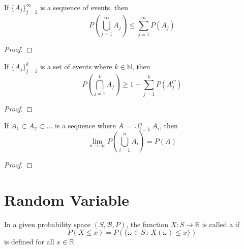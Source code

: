 \documentclass[notoc,notitlepage]{tufte-book}
\begin{document}
\begin{propo}\label{propo:boole_s_inequality}
  If $\{A_j\}_{j = 1}^{\infty}$ is a sequence of events, then
  \begin{equation*}
    P \left( \bigcup_{j = 1}^{\infty} A_j \right) \leq \sum_{j=1}^{\infty} P(A_j)
  \end{equation*}
\end{propo}

\begin{proof}
\end{proof}

\begin{propo}\label{propo:bonferroni_s_inequality}
  If $\{A_j\}_{j = 1}^{k}$ is a set of events where $k \in \mathbb{N}$, then
  \begin{equation*}
    P \left( \bigcap_{j = 1}^{k} A_j \right) \geq 1 - \sum_{j=1}^{k} P(A^C_j)
  \end{equation*}
\end{propo}

\begin{proof}
\end{proof}

\begin{propo}\label{propo:continuity_property}
  If $A_1 \subset A_2 \subset \hdots$ is a sequence where $A = \cup_{i = 1}^{n} A_i$, then
  \begin{equation*}
    \lim_{n \to \infty} P \left( \bigcup_{i = 1}^{n} A_i \right) = P(A)
  \end{equation*}
\end{propo}

\begin{proof}
\end{proof}


\section{Random Variable} %
\label{sec:random_variable}

\begin{defn}\label{defn:random_variable}
  In a given probability space $(S, \mathscr{B}, P)$, the function $X : S \to \mathbb{R}$ is called a  if
  \begin{equation}\label{eq:random_var_defn}
    P(X \leq x) = P \left( \{ \omega \in S \, : \, X(\omega) \leq x \} \right)
  \end{equation}
  is defined for all $x \in \mathbb{R}$.
\end{defn}
\end{document}
